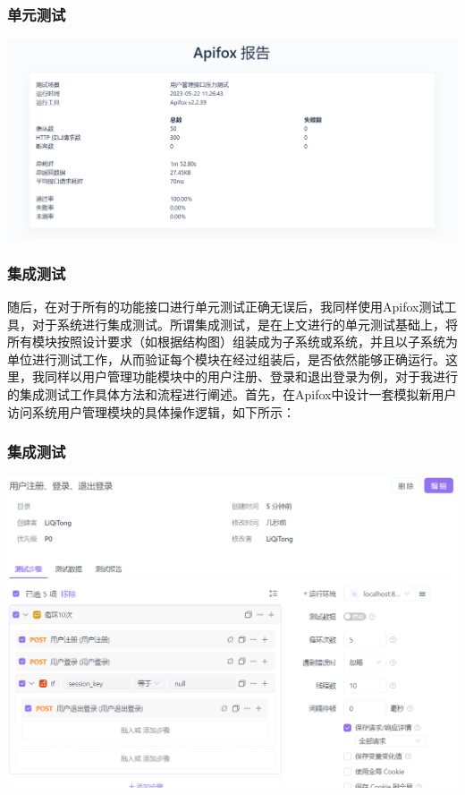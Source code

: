 \begin{frame}
    \frametitle{单元测试}
    \includegraphics[width=\textwidth]{contents/figure/user_register_2.png}
\end{frame}

\begin{frame}
    \frametitle{集成测试}
    随后，在对于所有的功能接口进行单元测试正确无误后，我同样使用Apifox测试工具，对于系统进行集成测试。所谓集成测试，是在上文进行的单元测试基础上，将所有模块按照设计要求（如根据结构图）组装成为子系统或系统，并且以子系统为单位进行测试工作，从而验证每个模块在经过组装后，是否依然能够正确运行。这里，我同样以用户管理功能模块中的用户注册、登录和退出登录为例，对于我进行的集成测试工作具体方法和流程进行阐述。首先，在Apifox中设计一套模拟新用户访问系统用户管理模块的具体操作逻辑，如下所示：
\end{frame}

\begin{frame}
    \frametitle{集成测试}
    \includegraphics[width=\textwidth]{contents/figure/user_register_3.png}
\end{frame}

